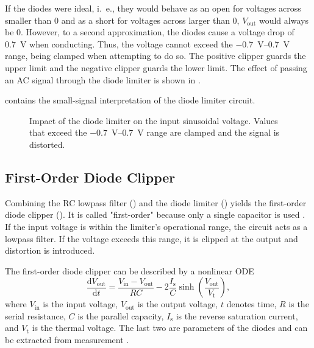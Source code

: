 If the diodes were ideal, i.\ e., they would behave as an open for voltages across smaller than 0 and as a short for voltages across larger than 0, $V_\text{out}$ would always be 0. However, to a second approximation, the diodes cause a voltage drop of \SI{0.7}{V} when conducting. Thus, the voltage cannot exceed the \SIrange{-0.7}{0.7}{V} range, being clamped when attempting to do so. The positive clipper guards the upper limit and the negative clipper guards the lower limit. The effect of passing an \ac{AC} signal through the diode limiter is shown in .

\cite{Yeh2007} contains the small-signal interpretation of the diode limiter circuit.

\begin{figure}
  \centering
  
  \caption{Impact of the diode limiter on the input sinusoidal voltage. Values that exceed the \SIrange{-0.7}{0.7}{V} range are clamped and the signal is distorted.}
  \label{fig:diode_limiter_signal}
\end{figure}


\subsection{First-Order Diode Clipper}
Combining the RC lowpass filter () and the diode limiter () yields the first-order diode clipper (). It is called "first-order" because only a single capacitor is used \cite{Parker2019}. If the input voltage is within the limiter's operational range, the circuit acts as a lowpass filter. If the voltage exceeds this range, it is clipped at the output and distortion is introduced.

The first-order diode clipper can be described by a nonlinear \ac{ODE} \cite{Yeh2007}
\begin{equation}
  \frac{\mathrm{d} V_\text{out}}{\mathrm{d}t} = \frac{V_\text{in} - V_\text{out}}{RC} - 2 \frac{I_\text{s}}{C} \sinh \left(\frac{V_\text{out}}{V_\text{t}}\right),
  \label{eq:diode_clipper_equation}
\end{equation}
where $V_\text{in}$ is the input voltage, $V_\text{out}$ is the output voltage, $t$ denotes time, $R$ is the serial resistance, $C$ is the parallel capacity, $I_\text{s}$ is the reverse saturation current, and $V_\text{t}$ is the thermal voltage. The last two are parameters of the diodes and can be extracted from measurement \cite{Yeh2007}.

